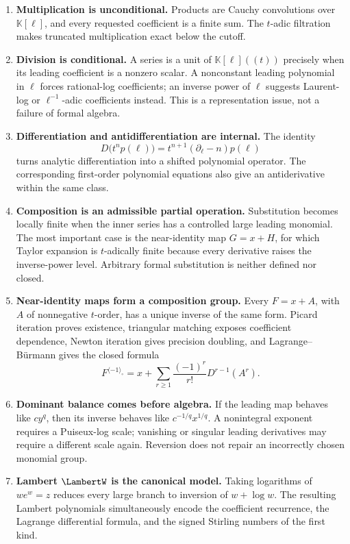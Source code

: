 \documentclass[11pt,oneside]{article}
\numberwithin{equation}{section}
\theoremstyle{definition}
\newcommand{\K}{\mathbb{K}}
\newcommand{\rev}{\langle-1\rangle_{\circ}}
\begin{document}
\begin{enumerate}
\item \textbf{Multiplication is unconditional.}
  Products are Cauchy convolutions over \(\K[\ell]\), and every requested
  coefficient is a finite sum.  The \(t\)-adic filtration makes truncated
  multiplication exact below the cutoff.

\item \textbf{Division is conditional.}
  A series is a unit of \(\K[\ell]((t))\) precisely when its leading
  coefficient is a nonzero scalar.  A nonconstant leading polynomial in
  \(\ell\) forces rational-log coefficients; an inverse power of \(\ell\)
  suggests Laurent-log or \(\ell^{-1}\)-adic coefficients instead.  This is a
  representation issue, not a failure of formal algebra.

\item \textbf{Differentiation and antidifferentiation are internal.}
  The identity
  \[
    D\bigl(t^n p(\ell)\bigr)
       =t^{n+1}(\partial_\ell-n)p(\ell)
  \]
  turns analytic differentiation into a shifted polynomial operator.  The
  corresponding first-order polynomial equations also give an antiderivative
  within the same class.

\item \textbf{Composition is an admissible partial operation.}
  Substitution becomes locally finite when the inner series has a controlled
  large leading monomial.  The most important case is the near-identity map
  \(G=x+H\), for which Taylor expansion is \(t\)-adically finite because every
  derivative raises the inverse-power level.  Arbitrary formal substitution is
  neither defined nor closed.

\item \textbf{Near-identity maps form a composition group.}
  Every \(F=x+A\), with \(A\) of nonnegative \(t\)-order, has a unique inverse
  of the same form.  Picard iteration proves existence, triangular matching
  exposes coefficient dependence, Newton iteration gives precision doubling,
  and Lagrange--B\"urmann gives the closed formula
  \[
    F^{\rev}=x+\sum_{r\ge1}\frac{(-1)^r}{r!}D^{r-1}(A^r).
  \]

\item \textbf{Dominant balance comes before algebra.}
  If the leading map behaves like \(cy^q\), then its inverse behaves like
  \(c^{-1/q}x^{1/q}\).  A nonintegral exponent requires a Puiseux-log scale;
  vanishing or singular leading derivatives may require a different scale
  again.  Reversion does not repair an incorrectly chosen monomial group.

\item \textbf{Lambert \(\LambertW\) is the canonical model.}
  Taking logarithms of \(we^w=z\) reduces every large branch to inversion of
  \(w+\log w\).  The resulting Lambert polynomials simultaneously encode the
  coefficient recurrence, the Lagrange differential formula, and the signed
  Stirling numbers of the first kind.
\end{enumerate}
\end{document}
